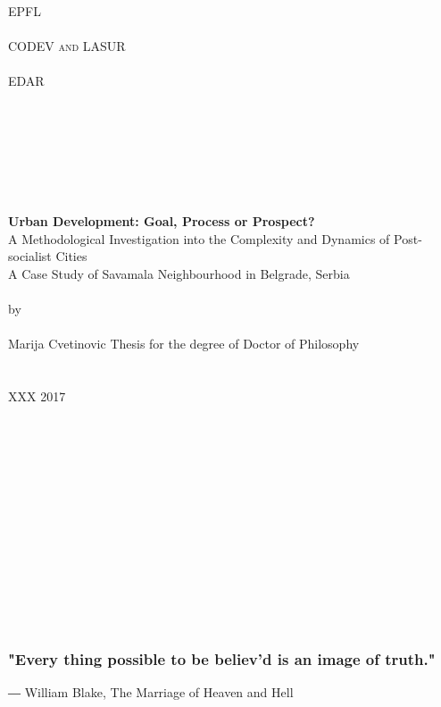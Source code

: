 \documentclass[11pt]{report}
\begin{document}
\begin{titlepage}
\begin{center}
\large
\textsc{EPFL} \\
\ \\
\textsc{CODEV and LASUR} \\
\ \\
\textsc{EDAR}\\
\ \\
\ \\
\ \\
\ \\
\ \\
\ \\
\ \\
\huge
\textbf{Urban Development: Goal, Process or Prospect?} 
\ \\
\huge
{A Methodological Investigation into the Complexity and Dynamics of Post-socialist Cities}
\ \\
\Large
{A Case Study of Savamala Neighbourhood in Belgrade, Serbia}
\ \\
\ \\
\large by
\ \\
\ \\
Marija Cvetinovic
\vfill
Thesis for the degree of Doctor of Philosophy \\
\ \\
\ \\
XXX 2017
\end{center}
\end{titlepage}
\begin{titlepage}
\begin{center}
\ \\
\ \\
\ \\
\ \\
\ \\
\ \\
\ \\
\ \\
\ \\
\ \\
\ \\
\ \\
\subsubsection{"Every thing possible to be believ'd is an image of truth."}

\end{center}

\begin{flushright}
― William Blake, The Marriage of Heaven and Hell
\end{flushright}

\end{titlepage}
\end{document}
